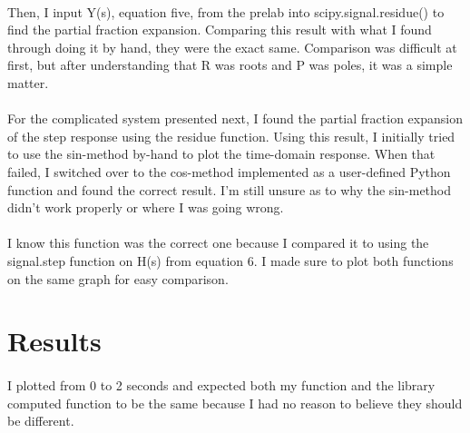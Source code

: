 \documentclass[12pt]{report}
\begin{document}
    \paragraph{} Then, I input Y(s), equation five, from the prelab into scipy.signal.residue() to find the partial fraction expansion. Comparing this result with what I found through doing it by hand, they were the exact same. Comparison was difficult at first, but after understanding that R was roots and P was poles, it was a simple matter. 
    \paragraph{} For the complicated system presented next, I found the partial fraction expansion of the step response using the residue function. Using this result, I initially tried to use the sin-method by-hand to plot the time-domain response. When that failed, I switched over to the cos-method implemented as a user-defined Python function and found the correct result. I'm still unsure as to why the sin-method didn't work properly or where I was going wrong. 
    \paragraph{} I know this function was the correct one because I compared it to using the signal.step function on H(s) from equation 6. I made sure to plot both functions on the same graph for easy comparison.  
    
\section{Results}


    \paragraph{} I plotted from 0 to 2 seconds and expected both my function and the library computed function to be the same because I had no reason to believe they should be different. 
    
\end{document}
